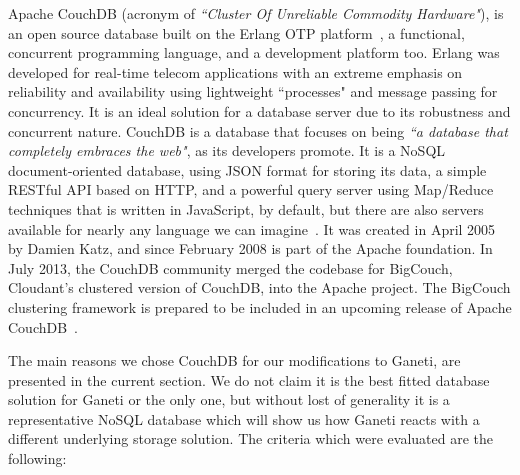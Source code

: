 Apache CouchDB (acronym of \emph{``Cluster Of Unreliable Commodity Hardware"}),
is an open source database built on the Erlang OTP platform~, a functional, concurrent programming language, and a development
platform too. Erlang was developed for real-time telecom applications with an
extreme emphasis on reliability and availability using lightweight ``processes"
and message passing for concurrency. It is an
ideal solution for a database server due to its robustness and concurrent
nature. CouchDB is a database that focuses on being \emph{``a database that
completely embraces the web"}, as its developers promote. It is a NoSQL
document-oriented database, using JSON format for storing its data, a simple
RESTful API based on HTTP, and a powerful query server using Map/Reduce
techniques that is written in JavaScript, by default, but there are also servers
available for nearly any language we can
imagine~.
It was created in April 2005 by Damien Katz, and since February 2008 is part of
the Apache foundation. In July 2013, the CouchDB community merged the codebase
for BigCouch, Cloudant's clustered version of CouchDB, into the Apache project.
The BigCouch clustering framework is prepared to be included in an upcoming
release of Apache CouchDB~\cite{bigcouch}.

The main reasons we chose CouchDB for our modifications to Ganeti,
are presented in the current section.  We do not claim it is the best fitted
database solution for Ganeti or the only one, but without lost of generality it
is a representative NoSQL database which will show us how Ganeti reacts with a
different underlying storage solution. The criteria which were evaluated are the
following:

